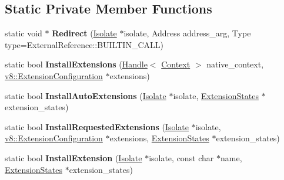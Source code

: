 \subsection*{Static Private Member Functions}
\begin{DoxyCompactItemize}
\item 
static void $\ast$ {\bfseries Redirect} (\hyperlink{classv8_1_1internal_1_1_isolate}{Isolate} $\ast$isolate, Address address\+\_\+arg, Type type=External\+Reference\+::\+B\+U\+I\+L\+T\+I\+N\+\_\+\+C\+A\+LL)\hypertarget{classv8_1_1internal_1_1_b_a_s_e___e_m_b_e_d_d_e_d_a9240da32bb9900992c660049ecf969df}{}\label{classv8_1_1internal_1_1_b_a_s_e___e_m_b_e_d_d_e_d_a9240da32bb9900992c660049ecf969df}

\item 
static bool {\bfseries Install\+Extensions} (\hyperlink{classv8_1_1internal_1_1_handle}{Handle}$<$ \hyperlink{classv8_1_1internal_1_1_context}{Context} $>$ native\+\_\+context, \hyperlink{classv8_1_1_extension_configuration}{v8\+::\+Extension\+Configuration} $\ast$extensions)\hypertarget{classv8_1_1internal_1_1_b_a_s_e___e_m_b_e_d_d_e_d_a7ae9ee6f60af00a53e67b21c39b9565a}{}\label{classv8_1_1internal_1_1_b_a_s_e___e_m_b_e_d_d_e_d_a7ae9ee6f60af00a53e67b21c39b9565a}

\item 
static bool {\bfseries Install\+Auto\+Extensions} (\hyperlink{classv8_1_1internal_1_1_isolate}{Isolate} $\ast$isolate, \hyperlink{classv8_1_1internal_1_1_b_a_s_e___e_m_b_e_d_d_e_d_1_1_extension_states}{Extension\+States} $\ast$extension\+\_\+states)\hypertarget{classv8_1_1internal_1_1_b_a_s_e___e_m_b_e_d_d_e_d_aea51bb5008bc37a4bb57b344eae6b3d6}{}\label{classv8_1_1internal_1_1_b_a_s_e___e_m_b_e_d_d_e_d_aea51bb5008bc37a4bb57b344eae6b3d6}

\item 
static bool {\bfseries Install\+Requested\+Extensions} (\hyperlink{classv8_1_1internal_1_1_isolate}{Isolate} $\ast$isolate, \hyperlink{classv8_1_1_extension_configuration}{v8\+::\+Extension\+Configuration} $\ast$extensions, \hyperlink{classv8_1_1internal_1_1_b_a_s_e___e_m_b_e_d_d_e_d_1_1_extension_states}{Extension\+States} $\ast$extension\+\_\+states)\hypertarget{classv8_1_1internal_1_1_b_a_s_e___e_m_b_e_d_d_e_d_acef4c9d25d4eb6d6bc1becaac6326d77}{}\label{classv8_1_1internal_1_1_b_a_s_e___e_m_b_e_d_d_e_d_acef4c9d25d4eb6d6bc1becaac6326d77}

\item 
static bool {\bfseries Install\+Extension} (\hyperlink{classv8_1_1internal_1_1_isolate}{Isolate} $\ast$isolate, const char $\ast$name, \hyperlink{classv8_1_1internal_1_1_b_a_s_e___e_m_b_e_d_d_e_d_1_1_extension_states}{Extension\+States} $\ast$extension\+\_\+states)\hypertarget{classv8_1_1internal_1_1_b_a_s_e___e_m_b_e_d_d_e_d_adb3db3a68afd023712a0e392fa289210}{}\label{classv8_1_1internal_1_1_b_a_s_e___e_m_b_e_d_d_e_d_adb3db3a68afd023712a0e392fa289210}


\end{DoxyCompactItemize}
